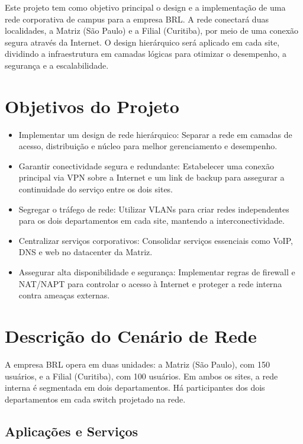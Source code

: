 \documentclass[a4paper, 12pt]{article}
\begin{document}
Este projeto tem como objetivo principal o design e a implementação de uma rede corporativa de campus para a empresa BRL. A rede conectará duas localidades, a Matriz (São Paulo) e a Filial (Curitiba), por meio de uma conexão segura através da Internet. O design hierárquico será aplicado em cada site, dividindo a infraestrutura em camadas lógicas para otimizar o desempenho, a segurança e a escalabilidade.

\section{Objetivos do Projeto}
\label{sec:objetivos}

\begin{itemize}
    \item Implementar um design de rede hierárquico: Separar a rede em camadas de acesso, distribuição e núcleo para melhor gerenciamento e desempenho.
    \item Garantir conectividade segura e redundante: Estabelecer uma conexão principal via VPN sobre a Internet e um link de backup para assegurar a continuidade do serviço entre os dois sites.
    \item Segregar o tráfego de rede: Utilizar VLANs para criar redes independentes para os dois departamentos em cada site, mantendo a interconectividade.
    \item Centralizar serviços corporativos: Consolidar serviços essenciais como VoIP, DNS e web no datacenter da Matriz.
    \item Assegurar alta disponibilidade e segurança: Implementar regras de firewall e NAT/NAPT para controlar o acesso à Internet e proteger a rede interna contra ameaças externas.
\end{itemize}

\section{Descrição do Cenário de Rede}
\label{sec:descricao}

A empresa BRL opera em duas unidades: a Matriz (São Paulo), com 150 usuários, e a Filial (Curitiba), com 100 usuários. Em ambos os sites, a rede interna é segmentada em dois departamentos. Há participantes dos dois departamentos em cada switch projetado na rede.

\subsection{Aplicações e Serviços}
\label{subsec:aplicacoes}
\end{document}
